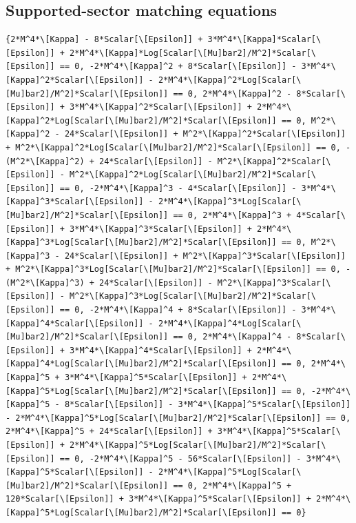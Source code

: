 \documentclass[11pt]{article}
\begin{document}
\subsection{Supported-sector matching equations}
\begin{verbatim}
{2*M^4*\[Kappa] - 8*Scalar[\[Epsilon]] + 3*M^4*\[Kappa]*Scalar[\[Epsilon]] + 2*M^4*\[Kappa]*Log[Scalar[\[Mu]bar2]/M^2]*Scalar[\[Epsilon]] == 0, -2*M^4*\[Kappa]^2 + 8*Scalar[\[Epsilon]] - 3*M^4*\[Kappa]^2*Scalar[\[Epsilon]] - 2*M^4*\[Kappa]^2*Log[Scalar[\[Mu]bar2]/M^2]*Scalar[\[Epsilon]] == 0, 2*M^4*\[Kappa]^2 - 8*Scalar[\[Epsilon]] + 3*M^4*\[Kappa]^2*Scalar[\[Epsilon]] + 2*M^4*\[Kappa]^2*Log[Scalar[\[Mu]bar2]/M^2]*Scalar[\[Epsilon]] == 0, M^2*\[Kappa]^2 - 24*Scalar[\[Epsilon]] + M^2*\[Kappa]^2*Scalar[\[Epsilon]] + M^2*\[Kappa]^2*Log[Scalar[\[Mu]bar2]/M^2]*Scalar[\[Epsilon]] == 0, -(M^2*\[Kappa]^2) + 24*Scalar[\[Epsilon]] - M^2*\[Kappa]^2*Scalar[\[Epsilon]] - M^2*\[Kappa]^2*Log[Scalar[\[Mu]bar2]/M^2]*Scalar[\[Epsilon]] == 0, -2*M^4*\[Kappa]^3 - 4*Scalar[\[Epsilon]] - 3*M^4*\[Kappa]^3*Scalar[\[Epsilon]] - 2*M^4*\[Kappa]^3*Log[Scalar[\[Mu]bar2]/M^2]*Scalar[\[Epsilon]] == 0, 2*M^4*\[Kappa]^3 + 4*Scalar[\[Epsilon]] + 3*M^4*\[Kappa]^3*Scalar[\[Epsilon]] + 2*M^4*\[Kappa]^3*Log[Scalar[\[Mu]bar2]/M^2]*Scalar[\[Epsilon]] == 0, M^2*\[Kappa]^3 - 24*Scalar[\[Epsilon]] + M^2*\[Kappa]^3*Scalar[\[Epsilon]] + M^2*\[Kappa]^3*Log[Scalar[\[Mu]bar2]/M^2]*Scalar[\[Epsilon]] == 0, -(M^2*\[Kappa]^3) + 24*Scalar[\[Epsilon]] - M^2*\[Kappa]^3*Scalar[\[Epsilon]] - M^2*\[Kappa]^3*Log[Scalar[\[Mu]bar2]/M^2]*Scalar[\[Epsilon]] == 0, -2*M^4*\[Kappa]^4 + 8*Scalar[\[Epsilon]] - 3*M^4*\[Kappa]^4*Scalar[\[Epsilon]] - 2*M^4*\[Kappa]^4*Log[Scalar[\[Mu]bar2]/M^2]*Scalar[\[Epsilon]] == 0, 2*M^4*\[Kappa]^4 - 8*Scalar[\[Epsilon]] + 3*M^4*\[Kappa]^4*Scalar[\[Epsilon]] + 2*M^4*\[Kappa]^4*Log[Scalar[\[Mu]bar2]/M^2]*Scalar[\[Epsilon]] == 0, 2*M^4*\[Kappa]^5 + 3*M^4*\[Kappa]^5*Scalar[\[Epsilon]] + 2*M^4*\[Kappa]^5*Log[Scalar[\[Mu]bar2]/M^2]*Scalar[\[Epsilon]] == 0, -2*M^4*\[Kappa]^5 - 8*Scalar[\[Epsilon]] - 3*M^4*\[Kappa]^5*Scalar[\[Epsilon]] - 2*M^4*\[Kappa]^5*Log[Scalar[\[Mu]bar2]/M^2]*Scalar[\[Epsilon]] == 0, 2*M^4*\[Kappa]^5 + 24*Scalar[\[Epsilon]] + 3*M^4*\[Kappa]^5*Scalar[\[Epsilon]] + 2*M^4*\[Kappa]^5*Log[Scalar[\[Mu]bar2]/M^2]*Scalar[\[Epsilon]] == 0, -2*M^4*\[Kappa]^5 - 56*Scalar[\[Epsilon]] - 3*M^4*\[Kappa]^5*Scalar[\[Epsilon]] - 2*M^4*\[Kappa]^5*Log[Scalar[\[Mu]bar2]/M^2]*Scalar[\[Epsilon]] == 0, 2*M^4*\[Kappa]^5 + 120*Scalar[\[Epsilon]] + 3*M^4*\[Kappa]^5*Scalar[\[Epsilon]] + 2*M^4*\[Kappa]^5*Log[Scalar[\[Mu]bar2]/M^2]*Scalar[\[Epsilon]] == 0}
\end{verbatim}
\end{document}
